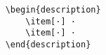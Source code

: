 \begin{verbatim}
    \begin{description}
        \item[·] ·
        \item[·] ·
    \end{description}
\end{verbatim}